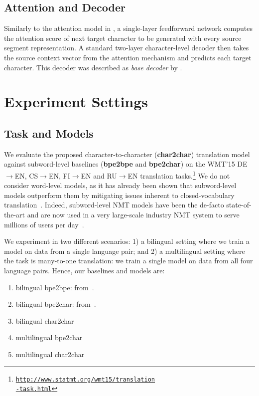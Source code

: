 \documentclass[11pt,letterpaper]{article}
\newcommand{\tb}{\textbf}
\newcommand{\nrr}{\color{black}}
\newcommand{\ra}{\rightarrow}
\begin{document}
    \subsection{Attention and Decoder}

    Similarly to the attention model in \cite{Chung:16,Firat:16}, a single-layer feedforward network computes the attention score of next target character to be generated with every source segment representation. {\nrr A standard two-layer character-level decoder then takes the source context vector from the attention mechanism and predicts each target character.} This decoder was described as \textit{base decoder} by .

\section{Experiment Settings}\label{sec:exp}

    \subsection{Task and Models}
    
    We evaluate the proposed character-to-character (\tb{char2char}) translation model against subword-level baselines (\tb{bpe2bpe} and \tb{bpe2char}) on the WMT'15 DE$\ra$EN, CS$\ra$EN, FI$\ra$EN and RU$\ra$EN translation tasks.\footnote{\tt\href{http://www.statmt.org/wmt15/translation-task.html}{http://www.statmt.org/wmt15/translation\\-task.html}} We do not consider word-level models, as it has already been shown that subword-level models outperform them by mitigating issues inherent to closed-vocabulary translation~\cite{Sennrich:15,Sennrich:16}. Indeed, subword-level NMT models have been the de-facto state-of-the-art and are now used in a very large-scale industry NMT system to serve millions of users per day~\cite{Wu:16}.
    
    We experiment in two different scenarios: 1) a bilingual setting where we train a model on data from a single language pair; and 2) a multilingual setting where the task is many-to-one translation: we train a single model on data from all four language pairs. Hence, our baselines and models are: 
    
    \begin{enumerate}[label=(\alph*)]
    \itemsep-0.3em 
    \item bilingual bpe2bpe: from~\cite{Firat:16}.
    \item bilingual bpe2char: from~\cite{Chung:16}.
    \item bilingual char2char
    \item multilingual bpe2char
    \item multilingual char2char
    \end{enumerate}
\end{document}
